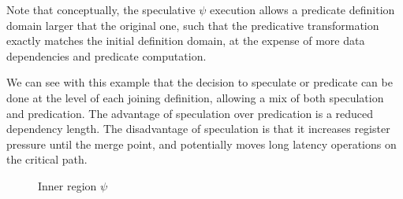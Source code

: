 Note that conceptually, the speculative $\psi$ execution allows a predicate definition domain larger that the original one, such that the predicative transformation exactly matches the initial definition domain, at the expense of more data dependencies and predicate computation.

We can see with this example that the decision to speculate or predicate can be done at the level of each joining definition, allowing a mix of both speculation and predication. The advantage of speculation over predication is a reduced dependency length. The disadvantage of speculation is that it increases register pressure until the merge point, and potentially moves long latency operations on the critical path.
 
\begin{figure}
\footnotesize
{}
\caption{Inner region $\psi$}
\end{figure}

